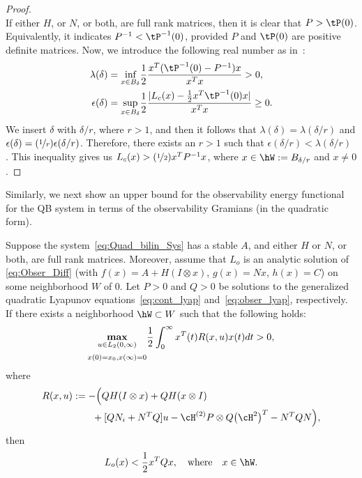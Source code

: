 \begin{proof}
\begin{equation*}
\end{equation*}
If either $H$, or $N$, or both, are full  rank matrices, then it is clear that $P > \tP(0)$. Equivalently, it indicates $P^{-1} < \tP^{-1}(0)$, provided $P$ and $\tP(0)$ are positive definite matrices. Now, we introduce the following real number as in~\cite{enefungray98}:
\begin{align*}
 \lambda(\delta) &= \underset{x\in B_\delta}{\text{inf}} \dfrac{1}{2}\dfrac{x^T (\tP^{-1}(0)-P^{-1})x}{x^Tx} > 0,\\
 \epsilon(\delta) &= \underset{x\in B_\delta}{\text{sup}}\dfrac{1}{2}\dfrac{|L_c(x)-\tfrac{1}{2}x^T\tP^{-1}(0)x|}{x^Tx} \geq 0.
\end{align*}
We insert $\delta$ with $\delta/r$, where $r>1$, and then it follows that $\lambda(\delta) = \lambda(\delta/r)$ and $\epsilon(\delta) = (\nicefrac{1}{r})\epsilon(\delta/r)$. Therefore, there exists an $r>1$ such that $\epsilon(\delta/r) < \lambda(\delta/r)$ . This inequality gives us $ L_c(x)>(\nicefrac{1}{2})x^TP^{-1}x$,  where  $x\in \hW:= B_{\delta/r}$ and $x\neq 0$.
\end{proof}
Similarly,  we next show an upper bound for the observability energy functional for the QB system in terms of the observability Gramians (in the quadratic form).
\begin{theorem}\label{thm:obs:bound}
 Suppose the system~\eqref{eq:Quad_bilin_Sys}  has a stable $A$, and either $H$ or $N$, or both, are full rank matrices. Moreover, assume that $L_o$ is an analytic solution of \eqref{eq:Obser_Diff} (with $f(x) = A+H(I\otimes x)$, $g(x) = Nx$, $h(x) = C$) on some neighborhood $W$ of $0$. Let  $P>0$ and $Q>0$ be  solutions to the generalized quadratic Lyapunov equations~\eqref{eq:cont_lyap} and~\eqref{eq:obser_lyap}, respectively. If there exists a neighborhood $\hW \subset W$ such that the following holds:
\begin{align*}
\underset{\begin{subarray}{c}
 u\in L_2(0,\infty) \\[5pt]
 x(0)=x_0,x(\infty) = 0
  \end{subarray}}{\textbf{max}} \dfrac{1}{2}\int_0^\infty x^T(t)R(x,u) x(t)dt >0,
\end{align*}
where
\begin{align*}
R(x,u) &:=  -\Big( QH (I\otimes x) + QH (x\otimes I) \\
& \qquad + [QN_i + N^T Q]u-\cH^{(2)} P\otimes Q  \big(\cH^{2}\big)^T- N^TQN \Big) ,
\end{align*}
   then
 \begin{equation*}
  L_o(x) < \dfrac{1}{2}x^TQx,\quad \mbox{where}\quad x\in\hW.
 \end{equation*}
\end{theorem}
